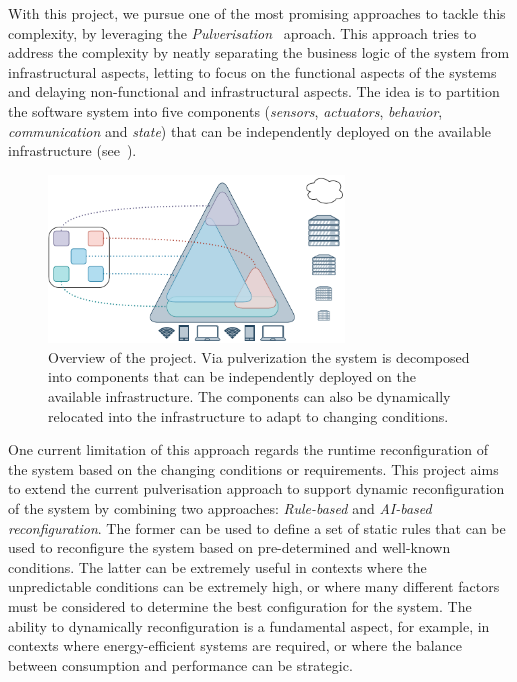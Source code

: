 \documentclass[12pt]{article}
\begin{document}
With this project,
we pursue one of the most promising approaches to tackle this complexity,
by leveraging the \emph{Pulverisation}~\cite{DBLP:journals/fi/CasadeiPPVW20} aproach.
%
This approach tries to address the complexity by neatly separating the business logic of the system from infrastructural aspects,
letting to focus on the functional aspects of the systems and delaying non-functional and infrastructural aspects.
%
The idea is to partition the software system into five components (\emph{sensors}, \emph{actuators}, \emph{behavior}, \emph{communication} and \emph{state})
that can be independently deployed on the available infrastructure (see~).
%
\begin{figure}[ht]
	\centering
	\includegraphics[width=0.7\textwidth]{img/phd-proposal.drawio.pdf}
	\caption{
		Overview of the project.
		Via pulverization the system is decomposed into components that can be independently deployed on the available infrastructure.
		The components can also be dynamically relocated into the infrastructure to adapt to changing conditions.
	}
	\label{fig:overview}
\end{figure}
%
One current limitation of this approach regards the runtime reconfiguration of the system based on the changing conditions or requirements.
%
This project aims to extend the current pulverisation approach to support dynamic reconfiguration of the system
by combining two approaches: \emph{Rule-based} and \emph{AI-based reconfiguration}.
%
The former can be used to define a set of static rules that can be used to reconfigure the system based on pre-determined and well-known conditions.
%
The latter can be extremely useful in contexts where the unpredictable conditions can be extremely high,
or where many different factors must be considered to determine the best configuration for the system.
%
The ability to dynamically reconfiguration is a fundamental aspect,
for example,
in contexts where energy-efficient systems are required,
or where the balance between consumption and performance can be strategic.
\end{document}
